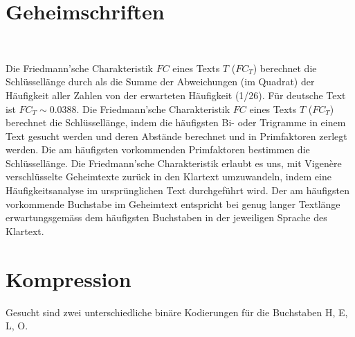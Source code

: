 \begin{questions}
{
\droptotalpoints
}

\section{Geheimschriften}
\\
\begin{choices}
 \correctchoice Die Friedmann'sche Charakteristik $FC$ eines Texts $T$ ($FC_T$) berechnet die Schlüssellänge durch als die Summe der Abweichungen (im Quadrat) der Häufigkeit aller Zahlen von der erwarteten Häufigkeit (1/26). Für deutsche Text ist $FC_T\sim 0.0388$.
 \choice Die Friedmann'sche Charakteristik $FC$ eines Texts $T$ ($FC_T$) berechnet die Schlüssellänge, indem die häufigsten Bi- oder Trigramme in einem Text gesucht werden und deren Abstände berechnet und in Primfaktoren zerlegt werden. Die am häufigsten vorkommenden Primfaktoren bestimmen die Schlüssellänge.
 \choice Die Friedmann'sche Charakteristik erlaubt es uns, mit Vigenère verschlüsselte Geheimtexte zurück in den Klartext umzuwandeln, indem eine Häufigkeitsanalyse im ursprünglichen Text durchgeführt wird. Der am häufigsten vorkommende Buchstabe im Geheimtext entspricht bei genug langer Textlänge erwartungsgemäss dem häufigsten Buchstaben in der jeweiligen Sprache des Klartext.
\end{choices}
\droptotalpoints

\section{Kompression}
\question
        Gesucht sind zwei unterschiedliche binäre Kodierungen für die Buchstaben H, E, L, O.
\end{questions}

